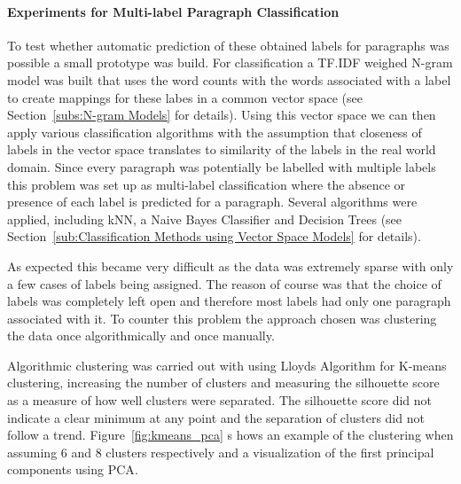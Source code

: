 \paragraph{Experiments for Multi-label Paragraph Classification}
\label{par:Experiments for Multi-label Paragraph Classification}

To test whether automatic prediction of these obtained labels for paragraphs was possible a small prototype was build. For classification a TF.IDF weighed N-gram model was built that uses the word counts with the words associated with a label to create mappings for these labes in a common vector space (see Section~\ref{subs:N-gram Models} for details). Using this vector space we can then apply various classification algorithms with the assumption that closeness of labels in the vector space translates to similarity of the labels in the real world domain. Since every paragraph was potentially be labelled with multiple labels this problem was set up as multi-label classification where the absence or presence of each label is predicted for a paragraph. Several algorithms were applied, including \gls{kNN}, a Naive Bayes Classifier and Decision Trees (see Section~\ref{sub:Classification Methods using Vector Space Models} for details).

As expected this became very difficult as the data was extremely sparse with only a few cases of labels being assigned. The reason of course was that the choice of labels was completely left open and therefore most labels had only one paragraph associated with it.
To counter this problem the approach chosen was clustering the data once algorithmically and once manually.

Algorithmic clustering was carried out with using \gls{Lloyds Algorithm} for \gls{K-means clustering}, increasing the number of clusters and measuring the \gls{silhouette score} as a measure of how well clusters were separated. The silhouette score did not indicate a clear minimum at any point and the separation of clusters did not follow a trend. Figure~\ref{fig:kmeans_pca} s
hows an example of the clustering when assuming 6 and 8 clusters respectively and a visualization of the first principal components using \gls{PCA}.

